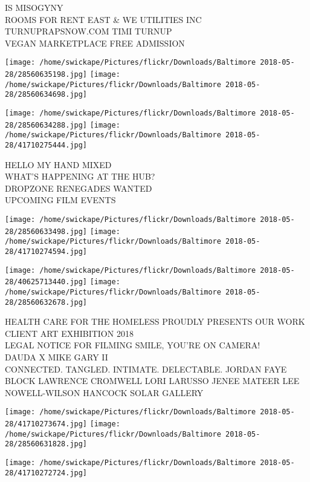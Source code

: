 \documentclass[10pt,letterpaper]{article}
\begin{document}
IS MISOGYNY\\
ROOMS FOR RENT EAST \& WE UTILITIES INC\\
TURNUPRAPSNOW.COM TIMI TURNUP\\
VEGAN MARKETPLACE FREE ADMISSION\\
\pagebreak

\texttt{[image: /home/swickape/Pictures/flickr/Downloads/Baltimore 2018-05-28/28560635198.jpg]}
\texttt{[image: /home/swickape/Pictures/flickr/Downloads/Baltimore 2018-05-28/28560634698.jpg]}

\texttt{[image: /home/swickape/Pictures/flickr/Downloads/Baltimore 2018-05-28/28560634288.jpg]}
\texttt{[image: /home/swickape/Pictures/flickr/Downloads/Baltimore 2018-05-28/41710275444.jpg]}

HELLO MY HAND MIXED\\
WHAT'S HAPPENING AT THE HUB?\\
DROPZONE RENEGADES WANTED\\
UPCOMING FILM EVENTS\\
\pagebreak

\texttt{[image: /home/swickape/Pictures/flickr/Downloads/Baltimore 2018-05-28/28560633498.jpg]}
\texttt{[image: /home/swickape/Pictures/flickr/Downloads/Baltimore 2018-05-28/41710274594.jpg]}

\texttt{[image: /home/swickape/Pictures/flickr/Downloads/Baltimore 2018-05-28/40625713440.jpg]}
\texttt{[image: /home/swickape/Pictures/flickr/Downloads/Baltimore 2018-05-28/28560632678.jpg]}

HEALTH CARE FOR THE HOMELESS PROUDLY PRESENTS OUR WORK CLIENT ART EXHIBITION 2018\\
LEGAL NOTICE FOR FILMING SMILE, YOU'RE ON CAMERA!\\
DAUDA X MIKE GARY II\\
CONNECTED.  TANGLED.  INTIMATE.  DELECTABLE.  JORDAN FAYE BLOCK LAWRENCE CROMWELL LORI LARUSSO JENEE MATEER LEE NOWELL{-}WILSON HANCOCK SOLAR GALLERY\\
\pagebreak

\texttt{[image: /home/swickape/Pictures/flickr/Downloads/Baltimore 2018-05-28/41710273674.jpg]}
\texttt{[image: /home/swickape/Pictures/flickr/Downloads/Baltimore 2018-05-28/28560631828.jpg]}

\texttt{[image: /home/swickape/Pictures/flickr/Downloads/Baltimore 2018-05-28/41710272724.jpg]}
\end{document}
